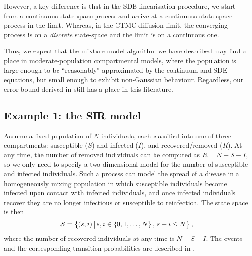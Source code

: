 However, a key difference is that in the SDE linearisation procedure, we start from a continuous state-space process and arrive at a continuous state-space process in the limit.
Whereas, in the CTMC diffusion limit, the converging process is on a \emph{discrete} state-space and the limit is on a continuous one.




Thus, we expect that the mixture model algorithm we have described may find a place in moderate-population compartmental models, where the population is large enough to be ``reasonably'' approximated by the continuum and SDE equations, but small enough to exhibit non-Gaussian behaviour.
Regardless, our error bound derived in  still has a place in this literature.



\subsection{Example 1: the SIR model}
Assume a fixed population of \(N\) individuals, each classified into one of three compartments: susceptible (\(S\)) and infected (\(I\)), and recovered/removed (\(R\)).
At any time, the number of removed individuals can be computed as \(R = N - S - I\), so we only need to specify a two-dimensional model for the number of susceptible and infected individuals.
Such a process can model the spread of a disease in a homogeneously mixing population in which susceptible individuals become infected upon contact with infected individuals, and once infected individuals recover they are no longer infectious or susceptible to reinfection.
The state space is then
\[
	\mathcal{S} = \left\{\left(s,i\right)\,\middle|\,s,i \in \set{0,1,\dotsc,N}, \, s + i \leq N\right\},
\]
where the number of recovered individuals at any time is \(N - S - I\).
The events and the corresponding transition probabilities are described in .

